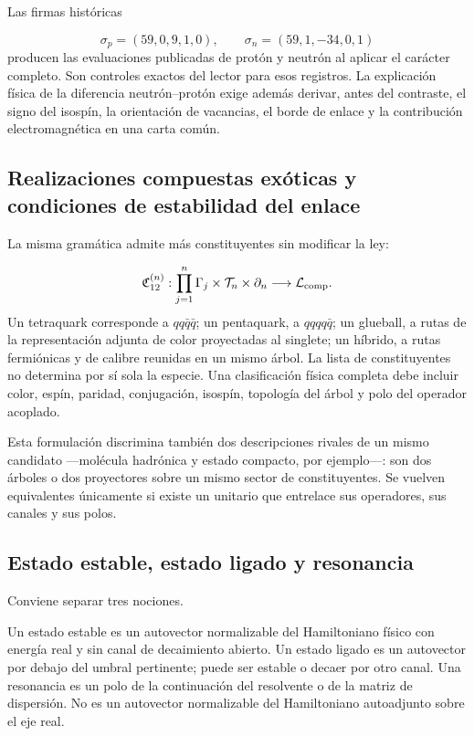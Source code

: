 Las firmas históricas

\[
\sigma_p=(59,0,9,1,0),
\qquad
\sigma_n=(59,1,-34,0,1)
\]
producen las evaluaciones publicadas de protón y neutrón al aplicar el carácter completo. Son controles exactos del lector para esos registros. La explicación física de la diferencia neutrón--protón exige además derivar, antes del contraste, el signo del isospín, la orientación de vacancias, el borde de enlace y la contribución electromagnética en una carta común.

\subsection{Realizaciones compuestas exóticas y condiciones de estabilidad del enlace}
La misma gramática admite más constituyentes sin modificar la ley:

\[
\mathfrak C_{12}^{(n)}:
\prod_{j=1}^{n}\Gamma_j\times\mathcal T_n\times\partial_n
\longrightarrow\mathcal L_{\rm comp}.
\]
Un tetraquark corresponde a \(qq\bar q\bar q\); un pentaquark, a \(qqqq\bar q\); un glueball, a rutas de la representación adjunta de color proyectadas al singlete; un híbrido, a rutas fermiónicas y de calibre reunidas en un mismo árbol. La lista de constituyentes no determina por sí sola la especie. Una clasificación física completa debe incluir color, espín, paridad, conjugación, isospín, topología del árbol y polo del operador acoplado.

Esta formulación discrimina también dos descripciones rivales de un mismo candidato ---molécula hadrónica y estado compacto, por ejemplo---: son dos árboles o dos proyectores sobre un mismo sector de constituyentes. Se vuelven equivalentes únicamente si existe un unitario que entrelace sus operadores, sus canales y sus polos.

\subsection{Estado estable, estado ligado y resonancia}
Conviene separar tres nociones.

Un estado estable es un autovector normalizable del Hamiltoniano físico con energía real y sin canal de decaimiento abierto. Un estado ligado es un autovector por debajo del umbral pertinente; puede ser estable o decaer por otro canal. Una resonancia es un polo de la continuación del resolvente o de la matriz de dispersión. No es un autovector normalizable del Hamiltoniano autoadjunto sobre el eje real.

